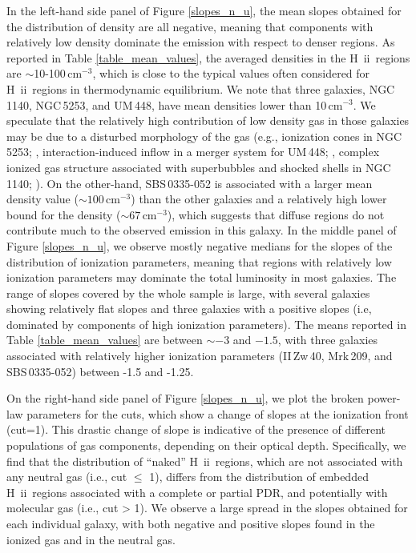 \documentclass{aa}
\newcommand{\hii}{H~{\sc ii}}
\begin{document}
In the left-hand side panel of Figure \ref{slopes_n_u}, the mean slopes obtained for the distribution of density are all negative, meaning that components with relatively low density dominate the emission with respect to denser regions. As reported in Table \ref{table_mean_values}, the averaged densities in the \hii\ regions are $\sim$10-100\,cm$^{-3}$, which is close to the typical values often considered for \hii\ regions in thermodynamic equilibrium. We note that three galaxies, NGC\,1140, NGC\,5253, and UM\,448, have mean densities lower than 10\,cm$^{-3}$. We speculate that the relatively high contribution of low density gas in those galaxies may be due to a disturbed morphology of the gas (e.g., ionization cones in NGC\,5253; \citealt{zastrow_ionization_2011}, interaction-induced inflow in a merger system for UM\,448; \citealt{James_2013}, complex ionized gas structure associated with superbubbles and shocked shells in NGC\,1140; \citealt{Westmoquette_ngc1140_2010}). On the other-hand, SBS\,0335-052 is associated with a larger mean density value ($\sim 100$\,cm$^{-3}$) than the other galaxies and a relatively high lower bound for the density ($\sim 67$\,cm$^{-3}$), which suggests that diffuse regions do not contribute much to the observed emission in this galaxy.
In the middle panel of Figure \ref{slopes_n_u}, we observe mostly negative medians for the slopes of the distribution of ionization parameters, meaning that regions with relatively low ionization parameters may dominate the total luminosity in most galaxies. The range of slopes covered by the whole sample is large, with several galaxies showing relatively flat slopes and three galaxies with a positive slopes (i.e, dominated by components of high ionization parameters). The means reported in Table \ref{table_mean_values} are between $\sim -3$ and $-1.5$, with three galaxies associated with relatively higher ionization parameters (II\,Zw\,40, Mrk\,209, and SBS\,0335-052) between -1.5 and -1.25.

On the right-hand side panel of Figure \ref{slopes_n_u}, we plot the broken power-law parameters for the cuts, which show a change of slopes at the ionization front (cut=1). 
This drastic change of slope is indicative of the presence of different populations of gas components, depending on their optical depth. Specifically, we find that the distribution of “naked” \hii\ regions, which are not associated with any neutral gas (i.e., cut $\leq$ 1), differs from the distribution of embedded \hii\ regions associated with a complete or partial PDR, and potentially with molecular gas (i.e., cut > 1). We observe a large spread in the slopes obtained for each individual galaxy, with both negative and positive slopes found in the ionized gas and in the neutral gas. 
\end{document}
